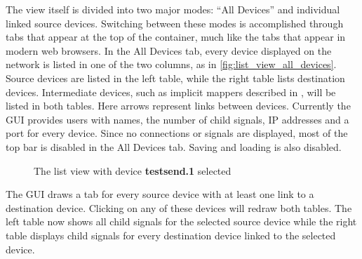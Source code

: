 The view itself is divided into two major modes: ``All Devices'' and individual linked source devices. Switching between these modes is accomplished through tabs that appear at the top of the container, much like the tabs that appear in modern web browsers. In the All Devices tab, every device displayed on the network is listed in one of the two columns, as in \ref{fig:list_view_all_devices}. Source devices are listed in the left table, while the right table lists destination devices. Intermediate devices, such as implicit mappers described in \cite{interpolated_mappings}, will be listed in both tables. Here arrows represent links between devices. Currently the GUI provides users with names, the number of child signals, IP addresses and a port for every device. Since no connections or signals are displayed, most of the top bar is disabled in the All Devices tab. Saving and loading is also disabled.

\begin{figure}[ht]
\centering
\caption{The list view with device \textbf{testsend.1} selected}
\label{fig:list_view_single_link}
\end{figure}

The GUI draws a tab for every source device with at least one link to a destination device. Clicking on any of these devices will redraw both tables. The left table now shows all child signals for the selected source device while the right table displays child signals for every destination device linked to the selected device. 

